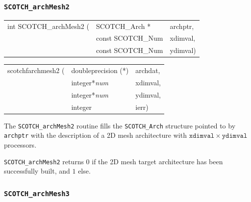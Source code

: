 \subsubsection{{\tt SCOTCH\_archMesh2}}

\begin{itemize}
\progsyn

{\tt\begin{tabular}{l@{}ll}
int SCOTCH\_archMesh2 ( & SCOTCH\_Arch *    & archptr, \\
                        & const SCOTCH\_Num & xdimval, \\
                        & const SCOTCH\_Num & ydimval) \\
\end{tabular}}

{\tt\begin{tabular}{l@{}ll}
scotchfarchmesh2 ( & doubleprecision (*) & archdat, \\
                   & integer*{\it num}   & xdimval, \\
                   & integer*{\it num}   & ydimval, \\
                   & integer             & ierr)
\end{tabular}}

\progdes

The {\tt SCOTCH\_archMesh2} routine fills the {\tt SCOTCH\_\lbt Arch}
structure pointed to by {\tt archptr} with the description of a
2D mesh architecture with $\mathtt{xdimval} \times \mathtt{ydimval}$
processors.

\progret

{\tt SCOTCH\_archMesh2} returns $0$ if the 2D mesh target
architecture has been successfully built, and $1$ else.
\end{itemize}

\subsubsection{{\tt SCOTCH\_archMesh3}}

